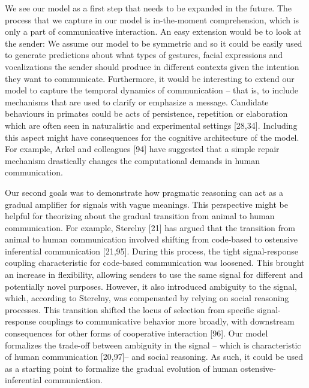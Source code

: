 \documentclass[
  man,floatsintext]{apa6}
\begin{document}
We see our model as a first step that needs to be expanded in the future. The process that we capture in our model is in-the-moment comprehension, which is only a part of communicative interaction. An easy extension would be to look at the sender: We assume our model to be symmetric and so it could be easily used to generate predictions about what types of gestures, facial expressions and vocalizations the sender should produce in different contexts given the intention they want to communicate. Furthermore, it would be interesting to extend our model to capture the temporal dynamics of communication -- that is, to include mechanisms that are used to clarify or emphasize a message. Candidate behaviours in primates could be acts of persistence, repetition or elaboration which are often seen in naturalistic and experimental settings {[}28,34{]}. Including this aspect might have consequences for the cognitive architecture of the model. For example, Arkel and colleagues {[}94{]} have suggested that a simple repair mechanism drastically changes the computational demands in human communication.

Our second goals was to demonstrate how pragmatic reasoning can act as a gradual amplifier for signals with vague meanings. This perspective might be helpful for theorizing about the gradual transition from animal to human communication. For example, Sterelny {[}21{]} has argued that the transition from animal to human communication involved shifting from code-based to ostensive inferential communication {[}21,95{]}. During this process, the tight signal-response coupling characteristic for code-based communication was loosened. This brought an increase in flexibility, allowing senders to use the same signal for different and potentially novel purposes. However, it also introduced ambiguity to the signal, which, according to Sterelny, was compensated by relying on social reasoning processes. This transition shifted the locus of selection from specific signal-response couplings to communicative behavior more broadly, with downstream consequences for other forms of cooperative interaction {[}96{]}. Our model formalizes the trade-off between ambiguity in the signal -- which is characteristic of human communication {[}20,97{]}-- and social reasoning. As such, it could be used as a starting point to formalize the gradual evolution of human ostensive-inferential communication.
\end{document}
